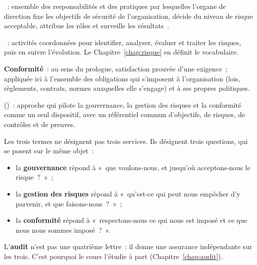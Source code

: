 \begin{boxdef}
~:
ensemble des responsabilités et des pratiques par lesquelles l'organe de
direction fixe les objectifs de sécurité de l'organisation, décide du
niveau de risque acceptable, attribue les rôles et surveille les
résultats~\cite{iso27014_2020}.

\medskip
{}~: activités
coordonnées pour identifier, analyser, évaluer et traiter les risques, puis
en suivre l'évolution. Le Chapitre~\ref{chap:risque} en définit le
vocabulaire.

\medskip
\textbf{Conformité}~: au sens du prologue, satisfaction prouvée d'une
exigence~; appliquée ici à l'ensemble des obligations qui s'imposent à
l'organisation (lois, règlements, contrats, normes auxquelles elle
s'engage) et à ses propres politiques.

\medskip
{} ()~:
approche qui pilote la
gouvernance, la gestion des risques et la conformité comme un seul
dispositif, avec un référentiel commun d'objectifs, de risques, de
contrôles et de preuves.
\end{boxdef}

Les trois termes ne désignent pas trois services. Ils désignent trois
questions, qui se posent sur le même objet~:
\begin{itemize}
    \item la \textbf{gouvernance} répond à «~que voulons-nous, et jusqu'où
          acceptons-nous le risque~?~»~;
    \item la \textbf{gestion des risques} répond à «~qu'est-ce qui peut nous
          empêcher d'y parvenir, et que faisons-nous~?~»~;
    \item la \textbf{conformité} répond à «~respectons-nous ce qui nous est
          imposé et ce que nous nous sommes imposé~?~».
\end{itemize}

L'\textbf{audit} n'est pas une quatrième lettre~: il donne une assurance
indépendante sur les trois. C'est pourquoi le cours l'étudie à part
(Chapitre~\ref{chap:audit}).


